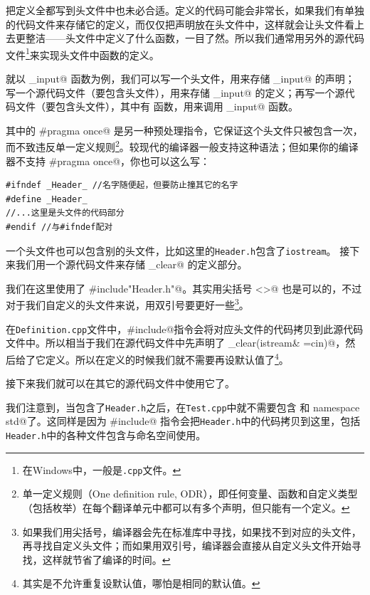 把定义全都写到头文件中也未必合适。定义的代码可能会非常长，如果我们有单独的代码文件来存储它的定义，而仅仅把声明放在头文件中，这样就会让头文件看上去更整洁——头文件中定义了什么函数，一目了然。所以我们通常用另外的源代码文件\footnote{在Windows中，一般是\texttt{.cpp}文件。}来实现头文件中函数的定义。\par
就以 \lstinline@clear_input@ 函数为例，我们可以写一个头文件，用来存储 \lstinline@clear_input@ 的声明；写一个源代码文件（要包含头文件），用来存储 \lstinline@clear_input@ 的定义；再写一个源代码文件（要包含头文件），其中有 \lstinline@main@ 函数，用来调用 \lstinline@clear_input@ 函数。\par

其中的 \lstinline@#pragma once@ 是另一种预处理指令，它保证这个头文件只被包含一次，而不致违反单一定义规则\footnote{单一定义规则（One definition rule, ODR），即任何变量、函数和自定义类型（包括枚举）在每个翻译单元中都可以有多个声明，但只能有一个定义。}。较现代的编译器一般支持这种语法；但如果你的编译器不支持 
\lstinline@#pragma once@，你也可以这么写：
\begin{lstlisting}
#ifndef _Header_ //名字随便起，但要防止撞其它的名字
#define _Header_ 
//...这里是头文件的代码部分
#endif //与#ifndef配对
\end{lstlisting}\par
一个头文件也可以包含别的头文件，比如这里的\texttt{Header.h}包含了\texttt{iostream}。
接下来我们用一个源代码文件来存储 \lstinline@input_clear@ 的定义部分。

我们在这里使用了 \lstinline@#include"Header.h"@。其实用尖括号 \lstinline@<>@ 也是可以的，不过对于我们自定义的头文件来说，用双引号要更好一些\footnote{如果我们用尖括号，编译器会先在标准库中寻找，如果找不到对应的头文件，再寻找自定义头文件；而如果用双引号，编译器会直接从自定义头文件开始寻找，这样就节省了编译的时间。}。\par
在\texttt{Definition.cpp}文件中，\lstinline@#include@指令会将对应头文件的代码拷贝到此源代码文件中。所以相当于我们在源代码文件中先声明了 \lstinline@input_clear(istream& ={cin})@，然后给了它定义。所以在定义的时候我们就不需要再设默认值了\footnote{其实是不允许重复设默认值，哪怕是相同的默认值。}。\par
接下来我们就可以在其它的源代码文件中使用它了。

我们注意到，当包含了\texttt{Header.h}之后，在\texttt{Test.cpp}中就不需要包含 \lstinline@iostream@ 和 \lstinline@using namespace std@了。这同样是因为 \lstinline@#include@ 指令会把\texttt{Header.h}中的代码拷贝到这里，包括\texttt{Header.h}中的各种文件包含与命名空间使用。\par
